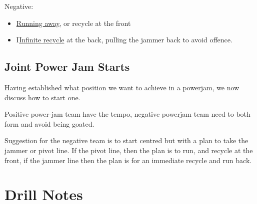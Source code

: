 \documentclass{journal}
\begin{document}
Negative:
\begin{itemize}
\item \hyperref[drill:power_jam/running_away]{Running away}, or recycle at the front
\item I\hyperref[drill:power_jam/infinite_recycle]{Infinite recycle} at the back, pulling the jammer back to avoid offence.
\end{itemize}

\subsection*{Joint Power Jam Starts}

Having established what position we want to achieve in a powerjam, we now discuss how to start one. 

Positive power-jam team have the tempo, negative powerjam team need to both form and avoid being goated.

Suggestion for the negative team is to start centred but with a plan to take the jammer or pivot line.
If the pivot line, then the plan is to run, and recycle at the front, if the jammer line then the plan is for an immediate recycle and run back. 


\pagebreak


\section*{Drill Notes}












\end{document}
